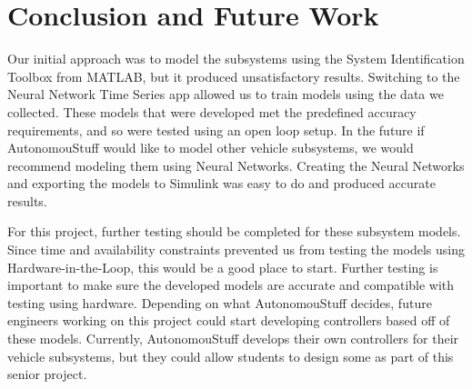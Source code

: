 \documentclass[journal,twoside,web]{ieeecolor}
\begin{document}
\section{Conclusion and Future Work}
\label{sec:conclustionAndFutureWork}
Our initial approach was to model the subsystems using the System Identification Toolbox from MATLAB, but it produced unsatisfactory results. Switching to the Neural Network Time Series app allowed us to train models using the data we collected. These models that were developed met the predefined accuracy requirements, and so were tested using an open loop setup. In the future if AutonomouStuff would like to model other vehicle subsystems, we would recommend modeling them using Neural Networks. Creating the Neural Networks and exporting the models to Simulink was easy to do and produced accurate results. 

For this project, further testing should be completed for these subsystem models. Since time and availability constraints prevented us from testing the models using Hardware-in-the-Loop, this would be a good place to start. Further testing is important to make sure the developed models are accurate and compatible with testing using hardware. Depending on what AutonomouStuff decides, future engineers working on this project could start developing controllers based off of these models. Currently, AutonomouStuff develops their own controllers for their vehicle subsystems, but they could allow students to design some as part of this senior project. 



\end{document}
